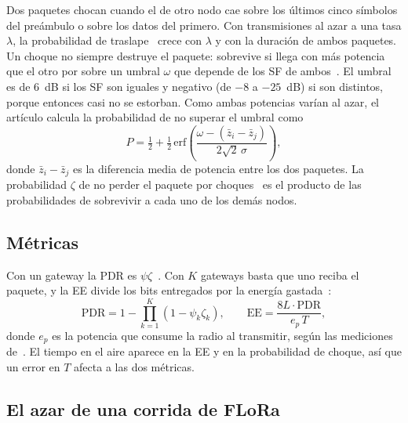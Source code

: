 \documentclass[conference,a4paper]{IEEEtran}
\begin{document}
Dos paquetes chocan cuando el de otro nodo cae sobre los últimos cinco símbolos del preámbulo o sobre los datos del primero. Con transmisiones al azar a una tasa $\lambda$, la probabilidad de traslape~\cite[ecs.~9 y 10]{fastlora} crece con $\lambda$ y con la duración de ambos paquetes. Un choque no siempre destruye el paquete: sobrevive si llega con más potencia que el otro por sobre un umbral $\omega$ que depende de los SF de ambos~\cite{croce}. El umbral es de 6~dB si los SF son iguales y negativo (de $-8$ a $-25$~dB) si son distintos, porque entonces casi no se estorban. Como ambas potencias varían al azar, el artículo calcula la probabilidad de no superar el umbral como~\cite[ec.~11]{fastlora}
\begin{equation}
  P=\tfrac12+\tfrac12\,\mathrm{erf}\!\left(\frac{\omega-(\bar{z}_i-\bar{z}_j)}{2\sqrt2\,\sigma}\right),
  \label{eq:once}
\end{equation}
donde $\bar{z}_i-\bar{z}_j$ es la diferencia media de potencia entre los dos paquetes. La probabilidad $\zeta$ de no perder el paquete por choques~\cite[ec.~12]{fastlora} es el producto de las probabilidades de sobrevivir a cada uno de los demás nodos.

\subsection{Métricas}

Con un gateway la PDR es $\psi\zeta$~\cite[ec.~6]{fastlora}. Con $K$ gateways basta que uno reciba el paquete, y la EE divide los bits entregados por la energía gastada~\cite[ecs.~13 y 17]{fastlora}:
\begin{equation}
  \mathrm{PDR}=1-\prod_{k=1}^{K}\left(1-\psi_k\zeta_k\right),\qquad
  \mathrm{EE}=\frac{8L\cdot\mathrm{PDR}}{e_p\,T},
  \label{eq:metricas}
\end{equation}
donde $e_p$ es la potencia que consume la radio al transmitir, según las mediciones de~\cite{liando}. El tiempo en el aire aparece en la EE y en la probabilidad de choque, así que un error en $T$ afecta a las dos métricas.

\subsection{El azar de una corrida de FLoRa}
\end{document}
